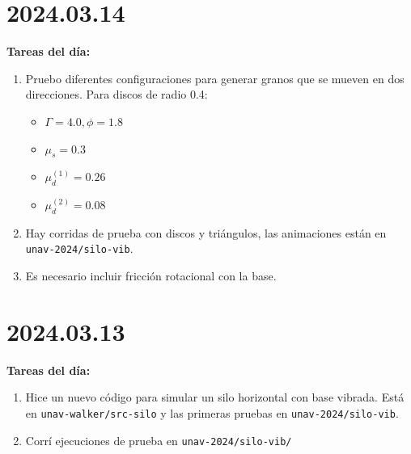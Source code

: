 \documentclass[11pt]{article}
\begin{document}
\section*{2024.03.14}
\textbf{Tareas del día:}
\begin{enumerate}
\item Pruebo diferentes configuraciones para generar granos que se mueven en dos direcciones. Para discos de radio 0.4:
    \begin{itemize}
      \item $\Gamma = 4.0, \phi = 1.8$
    \item $\mu_s = 0.3$
    \item $\mu_d^{(1)} = 0.26$
\item $\mu_d^{(2)} = 0.08$
    \end{itemize}
\item Hay corridas de prueba con discos y triángulos, las animaciones están en \texttt{unav-2024/silo-vib}.
\item {\color{red}{TODO:}} Es necesario incluir fricción rotacional con la base.
\end{enumerate}

\section*{2024.03.13}
\textbf{Tareas del día:}
\begin{enumerate}
\item Hice un nuevo código para simular un silo horizontal con base vibrada. Está en \texttt{unav-walker/src-silo} y las primeras pruebas en \texttt{unav-2024/silo-vib}.
\item Corrí ejecuciones de prueba en \texttt{unav-2024/silo-vib/}
\end{enumerate}
\end{document}
